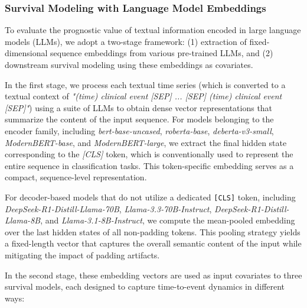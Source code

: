 \subsubsection{Survival Modeling with Language Model Embeddings}\label{ch07:sec:survival-modeling}

To evaluate the prognostic value of textual information encoded in large language models (LLMs), we adopt a two-stage framework: (1) extraction of fixed-dimensional sequence embeddings from various pre-trained LLMs, and (2) downstream survival modeling using these embeddings as covariates.

In the first stage, we process each textual time series (which is converted to a textual context of \emph{"(time) clinical event [SEP] ... [SEP] (time) clinical event [SEP]"}) using a suite of LLMs to obtain dense vector representations that summarize the content of the input sequence.
For models belonging to the encoder family, including \textit{bert-base-uncased}, \textit{roberta-base}, \textit{deberta-v3-small}, \textit{ModernBERT-base}, and \textit{ModernBERT-large}, we extract the final hidden state corresponding to the \textit{[CLS]} token, which is conventionally used to represent the entire sequence in classification tasks.
This token-specific embedding serves as a compact, sequence-level representation.

For decoder-based models that do not utilize a dedicated \texttt{[CLS]} token, including \textit{DeepSeek-R1-Distill-Llama-70B}, \textit{Llama-3.3-70B-Instruct}, \textit{DeepSeek-R1-Distill-Llama-8B}, and \textit{Llama-3.1-8B-Instruct}, we compute the mean-pooled embedding over the last hidden states of all non-padding tokens.
This pooling strategy yields a fixed-length vector that captures the overall semantic content of the input while mitigating the impact of padding artifacts.

In the second stage, these embedding vectors are used as input covariates to three survival models, each designed to capture time-to-event dynamics in different ways:


